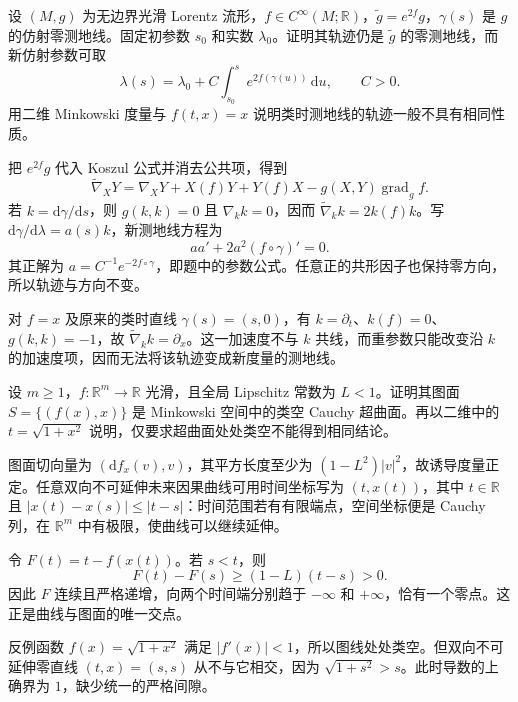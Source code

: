 \begin{exercise}\label{g3:ex:A-conformal-null-parameter}
	设 \((M,g)\) 为无边界光滑 Lorentz 流形，\(f\in C^\infty(M;\mathbb R)\)，\(\widetilde g=e^{2f}g\)，\(\gamma(s)\) 是 \(g\) 的仿射零测地线。固定初参数 \(s_0\) 和实数 \(\lambda_0\)。证明其轨迹仍是 \(\widetilde g\) 的零测地线，而新仿射参数可取
	\[
		\lambda(s)=\lambda_0+C\int_{s_0}^s e^{2f(\gamma(u))}\,\mathrm du,
		\qquad C>0.
	\]
	用二维 Minkowski 度量与 \(f(t,x)=x\) 说明类时测地线的轨迹一般不具有相同性质。
\end{exercise}
\begin{solution}
	把 \(e^{2f}g\) 代入 Koszul 公式并消去公共项，得到
	\[
		\widetilde\nabla_XY=\nabla_XY+X(f)Y+Y(f)X-g(X,Y)\operatorname{grad}_g f.
	\]
	若 \(k=\mathrm d\gamma/\mathrm ds\)，则 \(g(k,k)=0\) 且 \(\nabla_kk=0\)，因而 \(\widetilde\nabla_kk=2k(f)k\)。写 \(\mathrm d\gamma/\mathrm d\lambda=a(s)k\)，新测地线方程为
	\[
		a a'+2a^2(f\circ\gamma)'=0.
	\]
	其正解为 \(a=C^{-1}e^{-2f\circ\gamma}\)，即题中的参数公式。任意正的共形因子也保持零方向，所以轨迹与方向不变。

	对 \(f=x\) 及原来的类时直线 \(\gamma(s)=(s,0)\)，有 \(k=\partial_t\)、\(k(f)=0\)、\(g(k,k)=-1\)，故 \(\widetilde\nabla_kk=\partial_x\)。这一加速度不与 \(k\) 共线，而重参数只能改变沿 \(k\) 的加速度项，因而无法将该轨迹变成新度量的测地线。
\end{solution}

\begin{exercise}\label{g3:ex:A-cauchy-graph}
	设 \(m\ge1\)，\(f:\mathbb R^m\to\mathbb R\) 光滑，且全局 Lipschitz 常数为 \(L<1\)。证明其图面 \(S=\{(f(x),x)\}\) 是 Minkowski 空间中的类空 Cauchy 超曲面。再以二维中的 \(t=\sqrt{1+x^2}\) 说明，仅要求超曲面处处类空不能得到相同结论。
\end{exercise}
\begin{solution}
	图面切向量为 \((\mathrm df_x(v),v)\)，其平方长度至少为 \((1-L^2)|v|^2\)，故诱导度量正定。任意双向不可延伸未来因果曲线可用时间坐标写为 \((t,x(t))\)，其中 \(t\in\mathbb R\) 且 \(|x(t)-x(s)|\le|t-s|\)：时间范围若有有限端点，空间坐标便是 Cauchy 列，在 \(\mathbb R^m\) 中有极限，使曲线可以继续延伸。

	令 \(F(t)=t-f(x(t))\)。若 \(s<t\)，则
	\[
		F(t)-F(s)\ge(1-L)(t-s)>0.
	\]
	因此 \(F\) 连续且严格递增，向两个时间端分别趋于 \(-\infty\) 和 \(+\infty\)，恰有一个零点。这正是曲线与图面的唯一交点。

	反例函数 \(f(x)=\sqrt{1+x^2}\) 满足 \(|f'(x)|<1\)，所以图线处处类空。但双向不可延伸零直线 \((t,x)=(s,s)\) 从不与它相交，因为 \(\sqrt{1+s^2}>s\)。此时导数的上确界为 \(1\)，缺少统一的严格间隙。
\end{solution}

